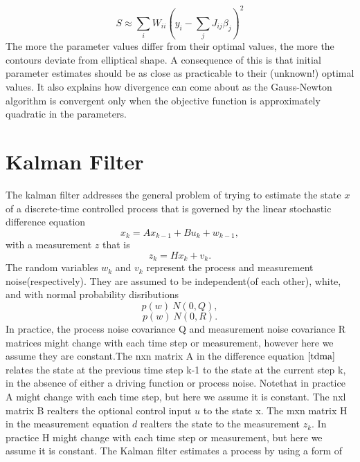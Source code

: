 \documentclass[a4paper,8pt]{report}
\begin{document}
\begin{equation}
    S \approx\sum_i W_{ii} \left(y_i-\sum_j J_{ij}\beta_j \right)^2
\end{equation}
The more the parameter values differ from their optimal values, the
more the contours deviate from elliptical shape. A consequence of
this is that initial parameter estimates should be as close as
practicable to their (unknown!) optimal values. It also explains how
divergence can come about as the Gauss-Newton algorithm is
convergent only when the objective function is approximately
quadratic in the parameters.\newpage \section{Kalman Filter} The
kalman filter addresses the general problem of trying to estimate
the state $x$ of a discrete-time controlled process that is governed
by the linear stochastic difference equation
\begin{equation}
 x_k = Ax_{k-1} + Bu_k + w_{k-1} ,
\end{equation}
with a measurement $z$ that is
\begin{equation}
 z_k = Hx_k + v_k.
\end{equation}
The random variables $w_k$ and $v_k$ represent the process and measurement noise(respectively). They are assumed to be independent(of each other), white, and with normal probability disributions
\begin{equation}
 p(w) ~N(0,Q),
\end{equation}
\begin{equation}
 p(w)~N(0,R).
\end{equation}
In practice, the process noise covariance Q and measurement noise
covariance R matrices might change with each time step or
measurement, however here we assume they are constant.\newline The
nxn matrix A in the difference equation $\ref{tdma}$ relates the
state at the previous time step k-1 to the state at the current step
k, in the absence of either a driving function or process noise.
Notethat in practice A might change with each time step, but here we
assume it is constant. The nxl matrix B realters the optional
control input $u$ to the state x. The mxn matrix H in the
measurement equation $d$ realters the state to the measurement
$z_k$. In practice H might change with each time step or
measurement, but here we assume it is constant. The Kalman filter estimates a process by using a form of
\end{document}
